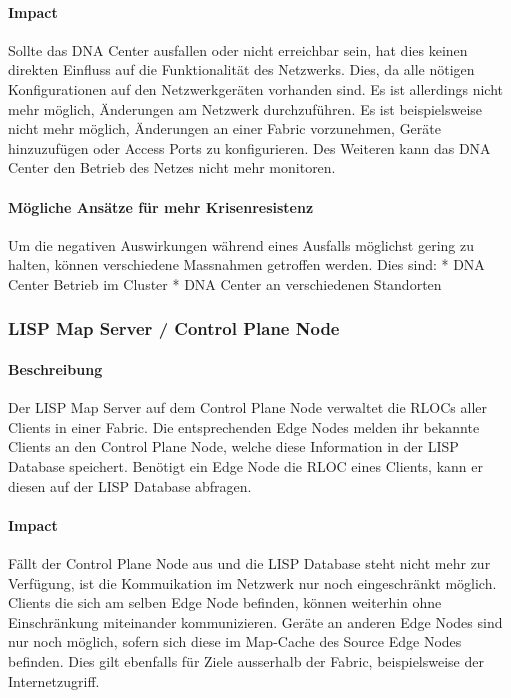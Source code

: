 \paragraph{Impact}

Sollte das DNA Center ausfallen oder nicht erreichbar sein, hat dies keinen direkten Einfluss auf die Funktionalität des Netzwerks. Dies, da alle nötigen Konfigurationen auf den Netzwerkgeräten vorhanden sind. Es ist allerdings nicht mehr möglich, Änderungen am Netzwerk durchzuführen. Es ist beispielsweise nicht mehr möglich, Änderungen an einer Fabric vorzunehmen, Geräte hinzuzufügen oder Access Ports zu konfigurieren. Des Weiteren kann das DNA Center den Betrieb des Netzes nicht mehr monitoren.

\paragraph{Mögliche Ansätze für mehr Krisenresistenz}

Um die negativen Auswirkungen während eines Ausfalls möglichst gering zu halten, können verschiedene Massnahmen getroffen werden. Dies sind:
* DNA Center Betrieb im Cluster
* DNA Center an verschiedenen Standorten

\subsubsection{LISP Map Server / Control Plane Node}

\paragraph{Beschreibung}

Der LISP Map Server auf dem Control Plane Node verwaltet die RLOCs aller Clients in einer Fabric. Die entsprechenden Edge Nodes melden ihr bekannte Clients an den Control Plane Node, welche diese Information in der LISP Database speichert. Benötigt ein Edge Node die RLOC eines Clients, kann er diesen auf der LISP Database abfragen.

\paragraph{Impact}

Fällt der Control Plane Node aus und die LISP Database steht nicht mehr zur Verfügung, ist die Kommuikation im Netzwerk nur noch eingeschränkt möglich. Clients die sich am selben Edge Node befinden, können weiterhin ohne Einschränkung miteinander kommunizieren. Geräte an anderen Edge Nodes sind nur noch möglich, sofern sich diese im Map-Cache des Source Edge Nodes befinden. Dies gilt ebenfalls für Ziele ausserhalb der Fabric, beispielsweise der Internetzugriff.

